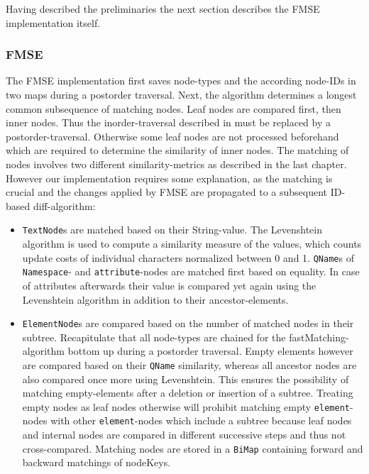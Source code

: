 Having described the preliminaries the next section describes the FMSE implementation itself.

\subsubsection{FMSE} The FMSE implementation first saves node-types and the according node-IDs in two maps during a postorder traversal. Next, the algorithm determines a longest common subsequence of matching nodes. Leaf nodes are compared first, then inner nodes. Thus the inorder-traversal described in \cite{chawathe1996change} must be replaced by a postorder-traversal. Otherwise some leaf nodes are not processed beforehand which are required to determine the similarity of inner nodes. The matching of nodes involves two different similarity-metrics as described in the last chapter. However our implementation requires some explanation, as the matching is crucial and the changes applied by FMSE are propagated to a subsequent ID-based diff-algorithm:

\begin{itemize}
\item \texttt{TextNode}s are matched based on their String-value. The Levenshtein algo\-rithm is used to compute a similarity measure of the values, which counts update costs of individual characters normalized between 0 and 1. \texttt{QName}s of \texttt{Namespace}- and \texttt{attribute}-nodes are matched first based on equality. In case of attributes afterwards their value is compared yet again using the Levenshtein algorithm in addition to their ancestor-elements.

\item \texttt{ElementNode}s are compared based on the number of matched nodes in their subtree. Recapitulate that all node-types are chained for the fast\-Matching-algorithm bottom up during a postorder traversal. Empty elements however are compared based on their \texttt{QName} similarity, whereas all ancestor nodes are also compared once more using Levenshtein. This ensures the possibility of matching empty-elements after a deletion or insertion of a subtree. Treating empty nodes as leaf nodes otherwise will prohibit matching empty \texttt{element}-nodes with other \texttt{element}-nodes which include a subtree because leaf nodes and internal nodes are compared in different successive steps and thus not cross-compared. Matching nodes are stored in a \texttt{BiMap} containing forward and backward matchings of nodeKeys.
\end{itemize}

